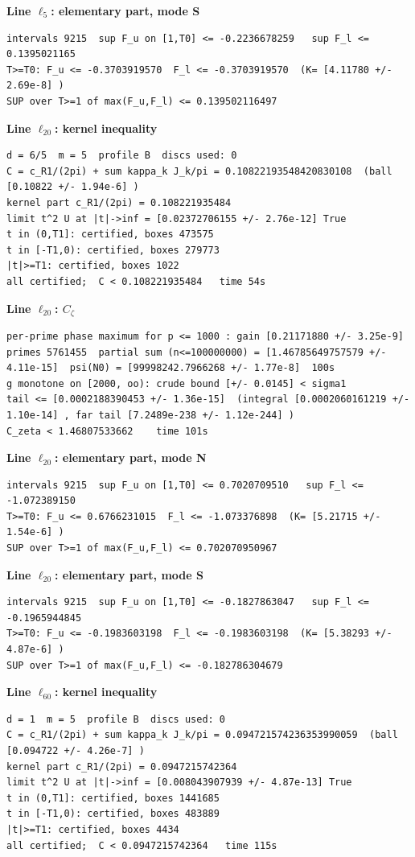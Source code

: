 \documentclass[11pt,reqno]{amsart}
\numberwithin{equation}{section}
\theoremstyle{definition}
\theoremstyle{remark}
\newcommand{\appsub}[1]{\par\medskip\noindent\textbf{#1}\par\nobreak\smallskip}
\begin{document}
\appsub{Line $\ell_{5}$: elementary part, mode S}
\begin{lstlisting}
intervals 9215  sup F_u on [1,T0] <= -0.2236678259   sup F_l <= 0.1395021165
T>=T0: F_u <= -0.3703919570  F_l <= -0.3703919570  (K= [4.11780 +/- 2.69e-8] )
SUP over T>=1 of max(F_u,F_l) <= 0.139502116497
\end{lstlisting}
\appsub{Line $\ell_{20}$: kernel inequality}
\begin{lstlisting}
d = 6/5  m = 5  profile B  discs used: 0
C = c_R1/(2pi) + sum kappa_k J_k/pi = 0.10822193548420830108  (ball [0.10822 +/- 1.94e-6] )
kernel part c_R1/(2pi) = 0.108221935484
limit t^2 U at |t|->inf = [0.02372706155 +/- 2.76e-12] True
t in (0,T1]: certified, boxes 473575
t in [-T1,0): certified, boxes 279773
|t|>=T1: certified, boxes 1022
all certified;  C < 0.108221935484   time 54s
\end{lstlisting}
\appsub{Line $\ell_{20}$: $C_\zeta$}
\begin{lstlisting}
per-prime phase maximum for p <= 1000 : gain [0.21171880 +/- 3.25e-9]
primes 5761455  partial sum (n<=100000000) = [1.46785649757579 +/- 4.11e-15]  psi(N0) = [99998242.7966268 +/- 1.77e-8]  100s
g monotone on [2000, oo): crude bound [+/- 0.0145] < sigma1
tail <= [0.0002188390453 +/- 1.36e-15]  (integral [0.0002060161219 +/- 1.10e-14] , far tail [7.2489e-238 +/- 1.12e-244] )
C_zeta < 1.46807533662    time 101s
\end{lstlisting}
\appsub{Line $\ell_{20}$: elementary part, mode N}
\begin{lstlisting}
intervals 9215  sup F_u on [1,T0] <= 0.7020709510   sup F_l <= -1.072389150
T>=T0: F_u <= 0.6766231015  F_l <= -1.073376898  (K= [5.21715 +/- 1.54e-6] )
SUP over T>=1 of max(F_u,F_l) <= 0.702070950967
\end{lstlisting}
\appsub{Line $\ell_{20}$: elementary part, mode S}
\begin{lstlisting}
intervals 9215  sup F_u on [1,T0] <= -0.1827863047   sup F_l <= -0.1965944845
T>=T0: F_u <= -0.1983603198  F_l <= -0.1983603198  (K= [5.38293 +/- 4.87e-6] )
SUP over T>=1 of max(F_u,F_l) <= -0.182786304679
\end{lstlisting}
\appsub{Line $\ell_{60}$: kernel inequality}
\begin{lstlisting}
d = 1  m = 5  profile B  discs used: 0
C = c_R1/(2pi) + sum kappa_k J_k/pi = 0.094721574236353990059  (ball [0.094722 +/- 4.26e-7] )
kernel part c_R1/(2pi) = 0.0947215742364
limit t^2 U at |t|->inf = [0.008043907939 +/- 4.87e-13] True
t in (0,T1]: certified, boxes 1441685
t in [-T1,0): certified, boxes 483889
|t|>=T1: certified, boxes 4434
all certified;  C < 0.0947215742364   time 115s
\end{lstlisting}
\end{document}
